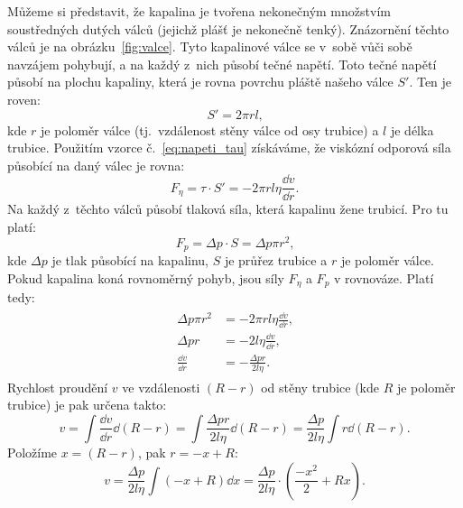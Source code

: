 \documentclass[12pt]{article}
\begin{document}
Můžeme si představit, že kapalina je tvořena nekonečným množstvím soustředných dutých válců (jejichž plášť je nekonečně tenký). Znázornění těchto válců je na obrázku~\ref{fig:valce}. Tyto kapalinové válce se v~sobě vůči sobě navzájem pohybují, a na každý z~nich působí tečné napětí. Toto tečné napětí působí na plochu kapaliny, která je rovna povrchu pláště našeho válce $S'$. Ten je roven:~\cite{book:Calibration_of_viscometers}
\begin{equation}
    S' = 2\pi rl\text{,}
\end{equation}
kde $r$ je poloměr válce (tj.~vzdálenost stěny válce od osy trubice) a $l$ je délka trubice. Použitím vzorce č.~\ref{eq:napeti_tau} získáváme, že viskózní odporová síla působící na daný válec je rovna:~\cite{book:Calibration_of_viscometers}
\begin{equation}
    F_\eta = \tau\cdot S' = -2\pi rl\eta\frac{\dd v}{\dd r}\text{.}
\end{equation}
Na každý z~těchto válců působí tlaková síla, která kapalinu žene trubicí. Pro tu platí:~\cite{book:Calibration_of_viscometers}
\begin{equation}
    F_p = \Delta p\cdot S = \Delta p\pi r^2\text{,}
\end{equation}
kde $\Delta p$ je tlak působící na kapalinu, $S$ je průřez trubice a $r$ je poloměr válce. Pokud kapalina koná rovnoměrný pohyb, jsou síly $F_\eta$ a $F_p$ v rovnováze. Platí tedy:~\cite{book:Calibration_of_viscometers}
\begin{align}
    \begin{split}
        \Delta p\pi r^2 &= -2\pi rl\eta\frac{\dd v}{\dd r}\text{,}\\
        \Delta pr &= -2l\eta\frac{\dd v}{\dd r}\text{,}\\
        \frac{\dd v}{\dd r} &= -\frac{\Delta pr}{2l\eta}\text{.}
    \end{split}
\end{align}
Rychlost proudění $v$ ve vzdálenosti $(R-r)$ od stěny trubice (kde $R$ je poloměr trubice) je pak určena takto:~\cite{book:Calibration_of_viscometers}
\begin{equation}
    v = \int \frac{\dd v}{\dd r} \dd (R-r) = \int \frac{\Delta pr}{2l\eta} \dd (R-r) = \frac{\Delta p}{2l\eta}\int r\dd (R-r)\text{.}
\end{equation}
Položíme $x = (R-r)$, pak $r = -x+R$:
\begin{equation}
    v = \frac{\Delta p}{2l\eta}\int(-x+R) \dd x = \frac{\Delta p}{2l\eta}\cdot(\frac{-x^2}{2}+Rx)\text{.}
\end{equation}
\end{document}
